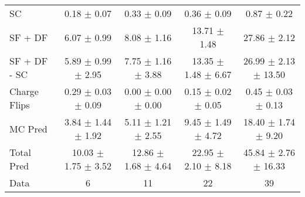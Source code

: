\begin{tabular}{l|cccc}
                                 SC &  0.18 $\pm$  0.07 &  0.33 $\pm$  0.09 &  0.36 $\pm$  0.09 &  0.87 $\pm$  0.22 \\
                            SF + DF &  6.07 $\pm$  0.99 &  8.08 $\pm$  1.16 & 13.71 $\pm$  1.48 & 27.86 $\pm$  2.12 \\
\hline
                       SF + DF - SC &  5.89 $\pm$  0.99 $\pm$  2.95 &  7.75 $\pm$  1.16 $\pm$  3.88 & 13.35 $\pm$  1.48 $\pm$  6.67 & 26.99 $\pm$  2.13 $\pm$ 13.50 \\
\hline\hline
                       Charge Flips &  0.29 $\pm$  0.03 $\pm$  0.09 &  0.00 $\pm$  0.00 $\pm$  0.00 &  0.15 $\pm$  0.02 $\pm$  0.05 &  0.45 $\pm$  0.03 $\pm$  0.13 \\
\hline
                            MC Pred &  3.84 $\pm$  1.44 $\pm$  1.92 &  5.11 $\pm$  1.21 $\pm$  2.55 &  9.45 $\pm$  1.49 $\pm$  4.72 & 18.40 $\pm$  1.74 $\pm$  9.20 \\
\hline
                         Total Pred & 10.03 $\pm$  1.75 $\pm$  3.52 & 12.86 $\pm$  1.68 $\pm$  4.64 & 22.95 $\pm$  2.10 $\pm$  8.18 & 45.84 $\pm$  2.76 $\pm$ 16.33 \\
\hline\hline
                               Data &     6 &    11 &    22 &    39 \\
\hline\hline
\end{tabular}


